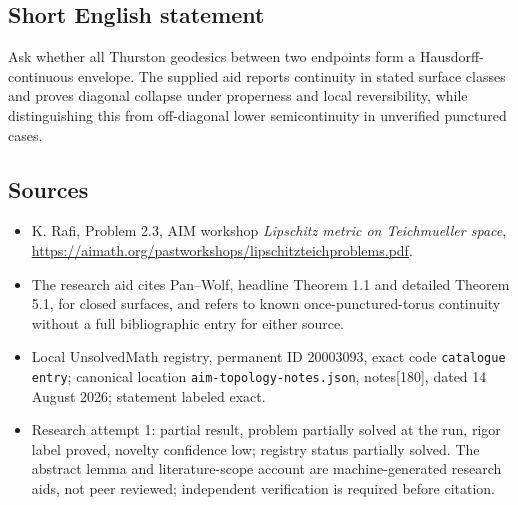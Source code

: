 \documentclass[11pt]{article}
\begin{document}
\subsection{Short English statement}
Ask whether all Thurston geodesics between two endpoints form a Hausdorff-continuous envelope. The supplied aid reports continuity in stated surface classes and proves diagonal collapse under properness and local reversibility, while distinguishing this from off-diagonal lower semicontinuity in unverified punctured cases.
\subsection{Sources}
\begin{itemize}
\item K. Rafi, Problem 2.3, AIM workshop \emph{Lipschitz metric on Teichmueller space}, \url{https://aimath.org/pastworkshops/lipschitzteichproblems.pdf}.
\item The research aid cites Pan--Wolf, headline Theorem 1.1 and detailed Theorem 5.1, for closed surfaces, and refers to known once-punctured-torus continuity without a full bibliographic entry for either source.
\item Local UnsolvedMath registry, permanent ID 20003093, exact code \texttt{catalogue entry}; canonical location \texttt{aim-topology-notes.json}, notes[180], dated 14 August 2026; statement labeled exact.
\item Research attempt 1: partial result, problem partially solved at the run, rigor label proved, novelty confidence low; registry status partially solved. The abstract lemma and literature-scope account are machine-generated research aids, not peer reviewed; independent verification is required before citation.
\end{itemize}
\end{document}
